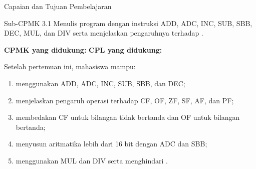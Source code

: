 \documentclass[aspectratio=169,11pt]{beamer}
\begin{document}

\begin{frame}{Capaian dan Tujuan Pembelajaran}
\begin{block}{Sub-CPMK 3.1}
\footnotesize Menulis program dengan instruksi ADD, ADC, INC, SUB,
SBB, DEC, MUL, dan DIV serta menjelaskan pengaruhnya terhadap
.
\end{block}

\vspace{0.1em}
{\small\textbf{CPMK yang didukung:} \quad\textbullet\quad
\textbf{CPL yang didukung:} \par}

\vspace{0.15em}
\begin{exampleblock}{Setelah pertemuan ini, mahasiswa mampu:}
\footnotesize
\begin{enumerate}
    \item menggunakan ADD, ADC, INC, SUB, SBB, dan DEC;
    \item menjelaskan pengaruh operasi terhadap CF, OF, ZF, SF,
          AF, dan PF;
    \item membedakan CF untuk bilangan tidak bertanda dan OF untuk
          bilangan bertanda;
    \item menyusun aritmatika lebih dari 16 bit dengan ADC dan SBB;
    \item menggunakan MUL dan DIV serta menghindari
          .
\end{enumerate}
\end{exampleblock}
\end{frame}
\end{document}
